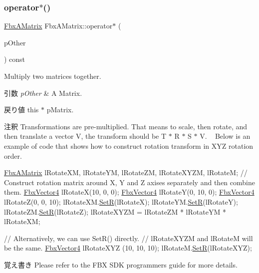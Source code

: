 \subsubsection{\texorpdfstring{operator$\ast$()}{operator*()}\hspace{0.1cm}{\footnotesize\ttfamily [2/2]}}
{\footnotesize\ttfamily \hyperlink{class_fbx_a_matrix}{Fbx\+A\+Matrix} Fbx\+A\+Matrix\+::operator$\ast$ (\begin{DoxyParamCaption}\item[{const \hyperlink{class_fbx_a_matrix}{Fbx\+A\+Matrix} \&}]{p\+Other }\end{DoxyParamCaption}) const}

Multiply two matrices together. 
\begin{DoxyParams}{引数}
{\em p\+Other} & A Matrix. \\
\hline
\end{DoxyParams}
\begin{DoxyReturn}{戻り値}
this $\ast$ p\+Matrix. 
\end{DoxyReturn}
\begin{DoxyRemark}{注釈}
Transformations are pre-\/multiplied. That means to scale, then rotate, and then translate a vector V, the transform should be T $\ast$ R $\ast$ S $\ast$ V. ~\newline
 Below is an example of code that shows how to construct rotation transform in X\+YZ rotation order. 
\begin{DoxyCode}
\hyperlink{class_fbx_a_matrix}{FbxAMatrix} lRotateXM, lRotateYM, lRotateZM, lRotateXYZM, lRotateM;
\textcolor{comment}{// Construct rotation matrix around X, Y and Z axises separately and then combine them.}
\hyperlink{class_fbx_vector4}{FbxVector4} lRotateX(10, 0, 0);
\hyperlink{class_fbx_vector4}{FbxVector4} lRotateY(0, 10, 0);
\hyperlink{class_fbx_vector4}{FbxVector4} lRotateZ(0, 0, 10);
lRotateXM.\hyperlink{class_fbx_a_matrix_ad749080abe63a56225df153dab876c1f}{SetR}(lRotateX);
lRotateYM.\hyperlink{class_fbx_a_matrix_ad749080abe63a56225df153dab876c1f}{SetR}(lRotateY);
lRotateZM.\hyperlink{class_fbx_a_matrix_ad749080abe63a56225df153dab876c1f}{SetR}(lRotateZ);
lRotateXYZM = lRotateZM * lRotateYM * lRotateXM;

\textcolor{comment}{// Alternatively, we can use SetR() directly.}
\textcolor{comment}{// lRotateXYZM and lRotateM will be the same.}
\hyperlink{class_fbx_vector4}{FbxVector4} lRotateXYZ (10, 10, 10);
lRotateM.\hyperlink{class_fbx_a_matrix_ad749080abe63a56225df153dab876c1f}{SetR}(lRotateXYZ);
\end{DoxyCode}
 
\end{DoxyRemark}
\begin{DoxyNote}{覚え書き}
Please refer to the F\+BX S\+DK programmers guide for more details. 
\end{DoxyNote}
\mbox{\label{class_fbx_a_matrix_a0b408712fcb77126c4a8f951ae8a219f}} 

